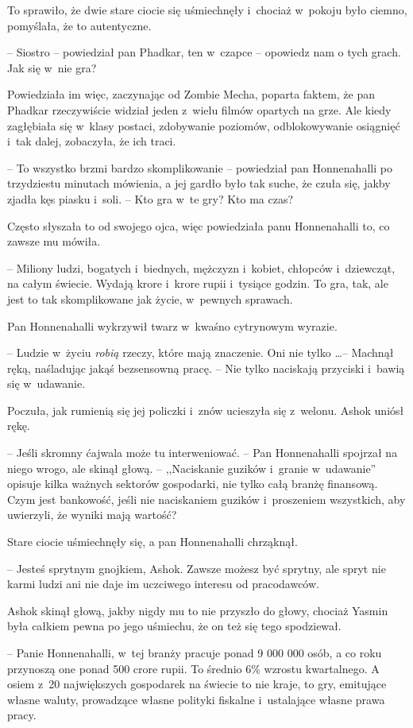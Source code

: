 \documentclass[oneside,polish,11pt,rmheadings]{mwbk}
\begin{document}
To sprawiło, że dwie stare ciocie się uśmiechnęły i~chociaż w~pokoju było ciemno, pomyślała, że to autentyczne.

-- Siostro -- powiedział pan Phadkar, ten w~czapce -- opowiedz nam o tych grach. Jak się w~nie gra?

Powiedziała im więc, zaczynając od Zombie Mecha, poparta faktem, że pan Phadkar rzeczywiście widział jeden z~wielu filmów opartych na grze. Ale kiedy zagłębiała się w~klasy postaci, zdobywanie poziomów, odblokowywanie osiągnięć i~tak dalej, zobaczyła, że ich traci.

-- To wszystko brzmi bardzo skomplikowanie -- powiedział pan Honnenahalli po trzydziestu minutach mówienia, a jej gardło było tak suche, że czuła się, jakby zjadła kęs piasku i~soli. -- Kto gra w~te gry? Kto ma czas?

Często słyszała to od swojego ojca, więc powiedziała panu Honnenahalli to, co zawsze mu mówiła. 

-- Miliony ludzi, bogatych i~biednych, mężczyzn i~kobiet, chłopców i~dziewcząt, na całym świecie. Wydają krore i~krore rupii i~tysiące godzin. To gra, tak, ale jest to tak skomplikowane jak życie, w~pewnych sprawach.

Pan Honnenahalli wykrzywił twarz w~kwaśno cytrynowym wyrazie. 

-- Ludzie w~życiu \textit{robią }rzeczy, które mają znaczenie. Oni nie tylko \ldots  -- Machnął ręką, naśladując jakąś bezsensowną pracę. -- Nie tylko naciskają przyciski i~bawią się w~udawanie.

Poczuła, jak rumienią się jej policzki i~znów ucieszyła się z~welonu. Ashok uniósł rękę. 

-- Jeśli skromny ćajwala może tu interweniować. -- Pan Honnenahalli spojrzał na niego wrogo, ale skinął głową. -- ,,Naciskanie guzików i~granie w~udawanie'' opisuje kilka ważnych sektorów gospodarki, nie tylko całą branżę finansową. Czym jest bankowość, jeśli nie naciskaniem guzików i~proszeniem wszystkich, aby uwierzyli, że wyniki mają wartość?

Stare ciocie uśmiechnęły się, a pan Honnenahalli chrząknął. 

-- Jesteś sprytnym gnojkiem, Ashok. Zawsze możesz być sprytny, ale spryt nie karmi ludzi ani nie daje im uczciwego interesu od pracodawców.

Ashok skinął głową, jakby nigdy mu to nie przyszło do głowy, chociaż Yasmin była całkiem pewna po jego uśmiechu, że on też się tego spodziewał. 

-- Panie Honnenahalli, w~tej branży pracuje ponad 9 000 000 osób, a co roku przynoszą one ponad 500 crore rupii. To średnio 6\% wzrostu kwartalnego. A osiem z~20 największych gospodarek na świecie to nie kraje, to gry, emitujące własne waluty, prowadzące własne polityki fiskalne i~ustalające własne prawa pracy.
\end{document}
